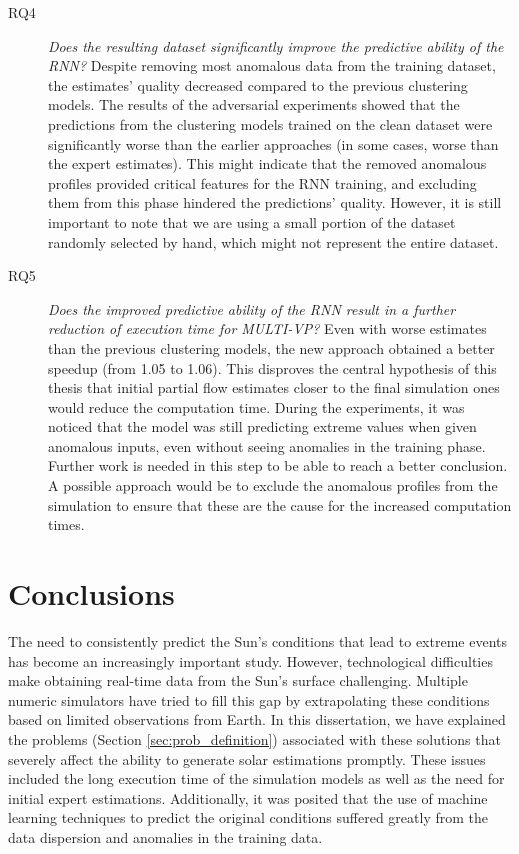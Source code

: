 \begin{description}
    \item[RQ4] \textit{Does the resulting dataset significantly improve the predictive ability of the RNN?} Despite removing most anomalous data from the training dataset, the estimates' quality decreased compared to the previous clustering models. The results of the adversarial experiments showed that the predictions from the clustering models trained on the clean dataset were significantly worse than the earlier approaches (in some cases, worse than the expert estimates). This might indicate that the removed anomalous profiles provided critical features for the RNN training, and excluding them from this phase hindered the predictions' quality. However, it is still important to note that we are using a small portion of the dataset randomly selected by hand, which might not represent the entire dataset.

    \item[RQ5] \textit{Does the improved predictive ability of the RNN result in a further reduction of execution
time for MULTI-VP?} Even with worse estimates than the previous clustering models, the new approach obtained a better speedup (from 1.05 to 1.06). This disproves the central hypothesis of this thesis that initial partial flow estimates closer to the final simulation ones would reduce the computation time. During the experiments, it was noticed that the model was still predicting extreme values when given anomalous inputs, even without seeing anomalies in the training phase. Further work is needed in this step to be able to reach a better conclusion. A possible approach would be to exclude the anomalous profiles from the simulation to ensure that these are the cause for the increased computation times.
\end{description} 

\section{Conclusions}\label{sec:conclusion}
The need to consistently predict the Sun's conditions that lead to extreme events has become an increasingly important study. However, technological difficulties make obtaining real-time data from the Sun's surface challenging. Multiple numeric simulators have tried to fill this gap by extrapolating these conditions based on limited observations from Earth. In this dissertation, we have explained the problems (Section \ref{sec:prob_definition}) associated with these solutions that severely affect the ability to generate solar estimations promptly. These issues included the long execution time of the simulation models as well as the need for initial expert estimations. Additionally, it was posited that the use of machine learning techniques to predict the original conditions suffered greatly from the data dispersion and anomalies in the training data.

